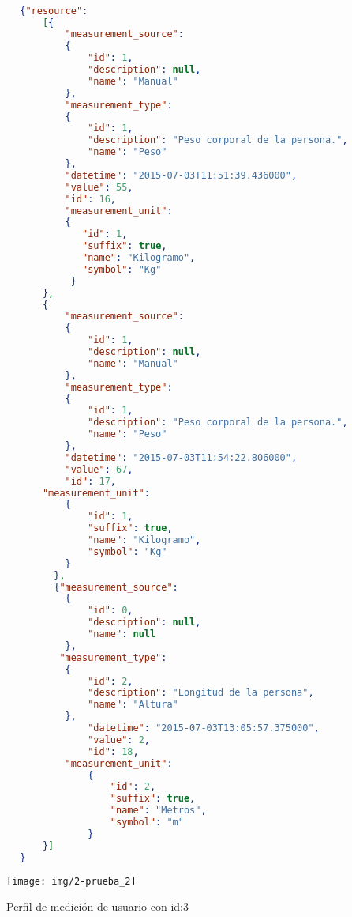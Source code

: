 {\scriptsize
    \begin{lstlisting}[language=json,firstnumber=1,  breaklines=true, caption= Json de las mediciones del perfil id:3, label=JsonMediciones]

        {"resource": 
	        [{
	    	    "measurement_source": 
        		{
		            "id": 1,
        		    "description": null,
		            "name": "Manual"
        		},
		        "measurement_type": 
        		{
		            "id": 1,
		            "description": "Peso corporal de la persona.",
		            "name": "Peso"
		        },
        		"datetime": "2015-07-03T11:51:39.436000",
		        "value": 55,
		        "id": 16,
    	    	"measurement_unit": 
                {
             	   "id": 1,
	               "suffix": true,
	               "name": "Kilogramo",
	               "symbol": "Kg"
	             }
    	    },
        	{
            	"measurement_source": 
		        {
        		    "id": 1,
		            "description": null,
		            "name": "Manual"
		        },
	        	"measurement_type": 
    		    {
	        	    "id": 1,
		            "description": "Peso corporal de la persona.",
		            "name": "Peso"
		        },
        		"datetime": "2015-07-03T11:54:22.806000",
		        "value": 67,
		        "id": 17,
        	"measurement_unit": 
	            {
    	            "id": 1,
        	        "suffix": true,
            	    "name": "Kilogramo",
                	"symbol": "Kg"
                }
              },
              {"measurement_source": 
                {
                    "id": 0,
                    "description": null,
                    "name": null
                },
               "measurement_type": 
                {
                    "id": 2,
                    "description": "Longitud de la persona",
                    "name": "Altura"
                },
	                "datetime": "2015-07-03T13:05:57.375000",
    	            "value": 2,
        	        "id": 18,
                "measurement_unit": 
                    {
                        "id": 2,
                        "suffix": true,
                        "name": "Metros",
                        "symbol": "m"
                    }
    	    }]
        }   
    \end{lstlisting}   


\begin{figure}[h]
        \centering
        \texttt{[image: img/2-prueba\_2]}
        \caption{Perfil de medición de usuario con id:3}
		\label{perfil_id_3}
\end{figure}


    }
\clearpage

